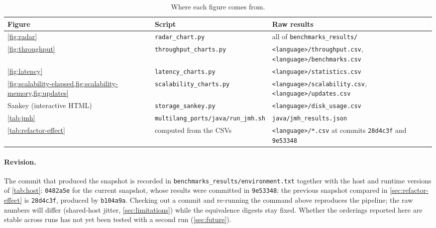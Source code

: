\begin{table}[htbp]
    \centering
    \small
    \caption{Where each figure comes from.}
    \label{tab:chart-map}
    \begin{tabularx}{\textwidth}{@{}llX@{}}
        \toprule
        Figure & Script & Raw results \\
        \midrule
        \cref{fig:radar} & \texttt{radar\_chart.py} & all of \texttt{benchmarks\_results/} \\
        \cref{fig:throughput} & \texttt{throughput\_charts.py} & \texttt{<language>/throughput.csv}, \texttt{<language>/benchmarks.csv} \\
        \cref{fig:latency} & \texttt{latency\_charts.py} & \texttt{<language>/statistics.csv} \\
        \cref{fig:scalability-elapsed,fig:scalability-memory,fig:updates} & \texttt{scalability\_charts.py} & \texttt{<language>/scalability.csv}, \texttt{<language>/updates.csv} \\
        Sankey (interactive HTML) & \texttt{storage\_sankey.py} & \texttt{<language>/disk\_usage.csv} \\
        \cref{tab:jmh} & \texttt{multilang\_ports/java/run\_jmh.sh} & \texttt{java/jmh\_results.json} \\
        \cref{tab:refactor-effect} & computed from the CSVs & \texttt{<language>/*.csv} at commits \texttt{28d4c3f} and \texttt{9e53348} \\
        \bottomrule
    \end{tabularx}
\end{table}

\paragraph{Revision.}
The commit that produced the snapshot is recorded in
\texttt{benchmarks\_\allowbreak results/\allowbreak environment.txt} together with the host and
runtime versions of \cref{tab:host}: \texttt{0482a5e} for the current
snapshot, whose results were committed in \texttt{9e53348}; the previous
snapshot compared in \cref{sec:refactor-effect} is \texttt{28d4c3f}, produced
by \texttt{b104a9a}. Checking out a commit and re-running the command above
reproduces the pipeline; the raw numbers will differ (shared-host jitter,
\cref{sec:limitations}) while the equivalence digests stay fixed. Whether the
orderings reported here are stable across runs has not yet been tested with a
second run (\cref{sec:future}).
